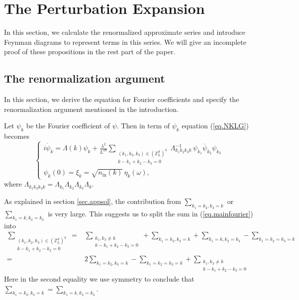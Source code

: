 \section{The Perturbation Expansion}
In this section, we calculate the renormalized approximate series and introduce Feynman diagrams to represent terms in this series. We will give an incomplete proof of these propositions in the rest part of the paper.


\subsection{The renormalization argument} In this section, we derive the equation for Fourier coefficients and specify the renormalization argument mentioned in the introduction.

Let $\psi_k$ be the Fourier coefficient of $\psi$. Then in term of $\psi_k$ equation (\ref{eq.NKLG}) becomes
\begin{equation}\label{eq.mainfourier}
\begin{cases}
 i \dot{\psi}_{k} =  \Lambda(k) \psi_k
 +\frac{\lambda^2}{L^{2d}} \sum\limits_{\substack{(k_1,k_2,k_{3}) \in (\mathbb{Z}^d_L)^3 \\ k - k_1 + k_2 -k_3 = 0}} \Lambda_{k_1k_2k_3k}^{-1}\,\psi_{k_1}\overline{\psi}_{k_2}  \psi_{k_3}  \\[2em]
\psi_k(0) = \xi_k = \sqrt{n_{\textrm{in}}(k)} \, \eta_{k}(\omega),
\end{cases}
\end{equation}
where $\Lambda_{k_1k_2k_3k}=\Lambda_{k_1}\Lambda_{k_2}\Lambda_{k_3}\Lambda_{k}$.

As explained in section \ref{sec.appsol}, the contribution from $\sum_{k_1=k_2,k_3=k}$ or $\sum_{k_1=k,k_2=k_3}$ is very large. This suggests us to split the sum in (\ref{eq.mainfourier}) into
\begin{equation}
\begin{split}
\sum\limits_{\substack{(k_1,k_2,k_{3}) \in (\mathbb{Z}^d_L)^3 \\ k - k_1 + k_2 -k_3 = 0}}
=&\sum_{\substack{k_1, k_3\neq k\\ k - k_1 + k_2 -k_3 = 0}}+\sum_{k_1=k_2,k_3=k}+\sum_{k_1=k,k_2=k_3}-\sum_{k_1=k_2=k_3=k}
\\
=&2\sum_{k_1=k_2,k_3=k}-\sum_{k_1=k_2=k_3=k} +\sum_{\substack{k_1, k_3\neq k\\ k - k_1 + k_2 -k_3 = 0}} 
\end{split}
\end{equation}
Here in the second equality we use symmetry to conclude that $\sum_{k_1=k_2,k_3=k}=\sum_{k_1=k,k_2=k_3}$.

